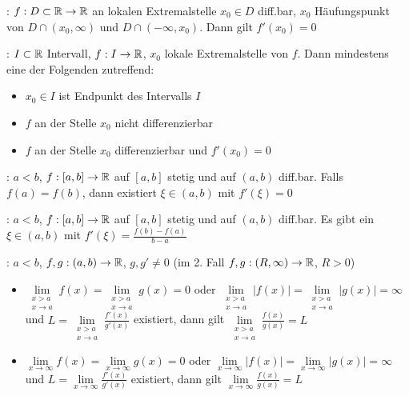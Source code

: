 \Satz {}: $f: D \subset \mathbb{R} \to \mathbb{R}$ an lokalen Extremalstelle
$x_0 \in D$ diff.bar, $x_0$ Häufungspunkt von $D \cap (x_0, \infty)$ und $D \cap (-\infty, x_0)$.
Dann gilt $f'(x_0) = 0$

\Satz {}: $I \subset \mathbb{R}$ Intervall, $f: I \to \mathbb{R}$,
$x_0$ lokale Extremalstelle von $f$. Dann mindestens eine der Folgenden zutreffend:
\vspace{-0.6em}
\begin{itemize}
    \item $x_0 \in I$ ist Endpunkt des Intervalls $I$
    \item $f$ an der Stelle $x_0$ nicht differenzierbar
    \item $f$ an der Stelle $x_0$ differenzierbar und $f'(x_0) = 0$
\end{itemize}

\Satz {}: $a < b$, $f: [a, b] \to \mathbb{R}$ auf $[a, b]$ stetig und auf $(a, b)$ diff.bar.
Falls $f(a) = f(b)$, dann existiert $\xi \in (a, b)$ mit $f'(\xi) = 0$

\Satz {}: $a < b$, $f: [a, b] \to \mathbb{R}$ auf $[a, b]$ stetig und auf $(a, b)$ diff.bar.
Es gibt ein $\xi \in (a, b)$ mit $f'(\xi) = \frac{f(b) - f(a)}{b - a}$

\Satz {}: $a < b$, $f, g: (a, b) \to \mathbb{R}$, $g, g' \ne 0$ (im 2. Fall $f, g: (R, \infty) \to \mathbb{R}$, $R > 0$)
\begin{itemize}
    \item $\lim\limits_{\substack{x > a \\ x \to a}} f(x) = \lim\limits_{\substack{x > a \\ x \to a}} g(x) = 0$ oder 
    $\lim\limits_{\substack{x > a \\ x \to a}} |f(x)| = \lim\limits_{\substack{x > a \\ x \to a}} |g(x)| = \infty$
    und $L = \lim\limits_{\substack{x > a \\ x \to a}} \frac{f'(x)}{g'(x)}$ existiert,
    dann gilt $\lim\limits_{\substack{x > a \\ x \to a}} \frac{f(x)}{g(x)} = L$
    \item $\lim\limits_{x\to\infty} f(x) = \lim\limits_{x\to\infty} g(x) = 0$ oder
    $\lim\limits_{x\to\infty} |f(x)| = \lim\limits_{x\to\infty} |g(x)| = \infty$
    und $L = \lim\limits_{x\to\infty} \frac{f'(x)}{g'(x)}$ existiert,
    dann gilt $\lim\limits_{x\to\infty} \frac{f(x)}{g(x)} = L$
\end{itemize}

